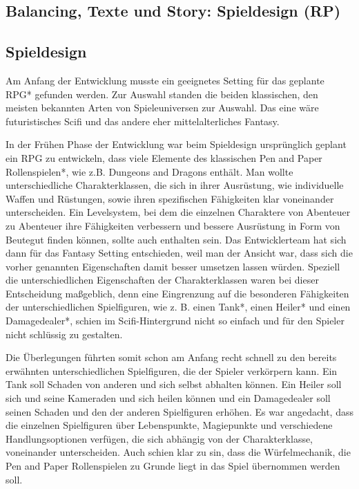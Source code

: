 

\subsection{Balancing, Texte und Story: Spieldesign (RP)}



\subsection{Spieldesign} Am Anfang der Entwicklung musste ein geeignetes Setting für das geplante RPG* gefunden werden. Zur Auswahl standen die beiden klassischen, den meisten bekannten Arten von Spieleuniversen zur Auswahl. Das eine wäre futuristisches Scifi und das andere eher mittelalterliches Fantasy. 

In der Frühen Phase der Entwicklung war beim Spieldesign ursprünglich geplant ein RPG zu entwickeln, dass viele Elemente des klassischen Pen and Paper Rollenspielen*, wie z.B. Dungeons and Dragons enthält. Man wollte unterschiedliche Charakterklassen, die sich in ihrer Ausrüstung, wie individuelle Waffen und Rüstungen, sowie ihren spezifischen Fähigkeiten klar voneinander unterscheiden. Ein Levelsystem, bei dem die einzelnen Charaktere von Abenteuer zu Abenteuer ihre Fähigkeiten verbessern und bessere Ausrüstung in Form von Beutegut finden können, sollte auch enthalten sein. Das Entwicklerteam hat sich dann für das Fantasy Setting entschieden, weil man der Ansicht war, dass sich die vorher genannten Eigenschaften damit besser umsetzen lassen würden. Speziell die unterschiedlichen Eigenschaften der Charakterklassen waren bei dieser Entscheidung maßgeblich, denn eine Eingrenzung auf die besonderen Fähigkeiten der unterschiedlichen Spielfiguren, wie z. B. einen Tank*, einen Heiler* und einen Damagedealer*, schien im Scifi-Hintergrund nicht so einfach und für den Spieler nicht schlüssig zu gestalten.

Die Überlegungen führten somit schon am Anfang recht schnell zu den bereits erwähnten unterschiedlichen Spielfiguren, die der Spieler verkörpern kann. Ein Tank soll Schaden von anderen und sich selbst abhalten können. Ein Heiler soll sich und seine Kameraden und sich heilen können und ein Damagedealer soll seinen Schaden und den der anderen Spielfiguren erhöhen. Es war angedacht, dass die einzelnen Spielfiguren über Lebenspunkte, Magiepunkte und verschiedene Handlungsoptionen verfügen, die sich abhängig von der Charakterklasse, voneinander unterscheiden. Auch schien klar zu sin, dass die Würfelmechanik, die Pen and Paper Rollenspielen zu Grunde liegt in das Spiel übernommen werden soll.

